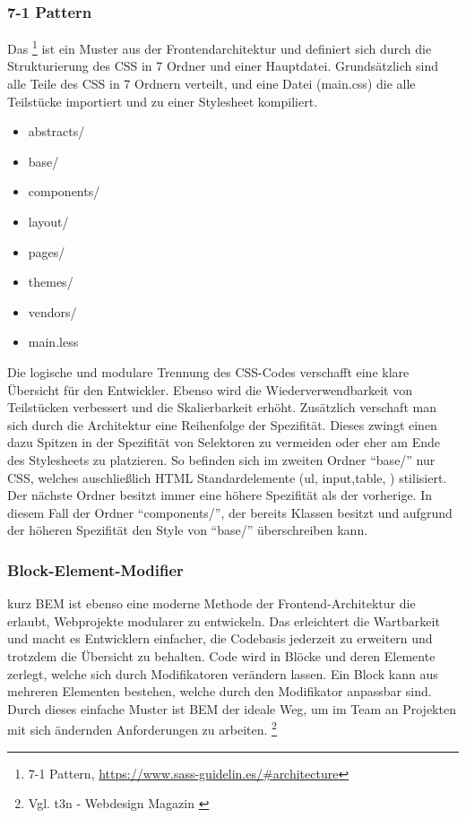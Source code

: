 \subsubsection{7-1 Pattern}
\label{sec:7-1}
Das 
\footnote{7-1 Pattern, \url{https://www.sass-guidelin.es/#architecture}} ist ein
Muster aus der Frontendarchitektur und definiert sich durch die Strukturierung des \ac{CSS} in 7 Ordner und
einer Hauptdatei. Grundsätzlich sind alle Teile des \ac{CSS} in 7 Ordnern
verteilt, und eine Datei (main.css) die alle Teilstücke importiert und zu einer Stylesheet kompiliert.
\begin{multicols}{4}
\begin{itemize}
\item abstracts/
\item base/
\item components/
\item layout/
\item pages/
\item themes/
\item vendors/
\item main.less
\end{itemize}
\end{multicols}
Die logische und modulare Trennung des \ac{CSS}-Codes verschafft eine klare
Übersicht für den Entwickler. Ebenso wird die Wiederverwendbarkeit von
Teilstücken verbessert und die Skalierbarkeit erhöht. Zusätzlich verschaft man
sich durch die Architektur eine Reihenfolge der Spezifität. Dieses zwingt einen
dazu Spitzen in der Spezifität von Selektoren zu vermeiden oder eher
am Ende des Stylesheets zu platzieren. So befinden sich im zweiten Ordner
"`base/"' nur \ac{CSS}, welches auschließlich HTML Standardelemente (\zB ul,
input,table, \usw) stilisiert. Der nächste Ordner besitzt immer eine höhere
Spezifität als der vorherige. In diesem Fall der Ordner "`components/"', der
bereits Klassen besitzt und aufgrund der höheren Spezifität den Style von
"`base/"' überschreiben kann.




\subsubsection{Block-Element-Modifier}
\label{sec:BEM}
 kurz \acs{BEM} ist ebenso eine moderne
Methode der Frontend-Architektur die erlaubt, Webprojekte modularer zu entwickeln.
Das erleichtert die Wartbarkeit und macht es Entwicklern einfacher, die
Codebasis jederzeit zu erweitern und trotzdem die Übersicht zu behalten.
Code wird in Blöcke und deren Elemente zerlegt, welche sich durch Modifikatoren
verändern lassen. Ein Block kann aus mehreren Elementen bestehen, welche durch
den Modifikator anpassbar sind. Durch dieses einfache Muster ist BEM der ideale
Weg, um im Team an Projekten mit sich ändernden Anforderungen zu arbeiten.
 \footnote{Vgl. t3n - Webdesign Magazin \cite{BEM}}
 
